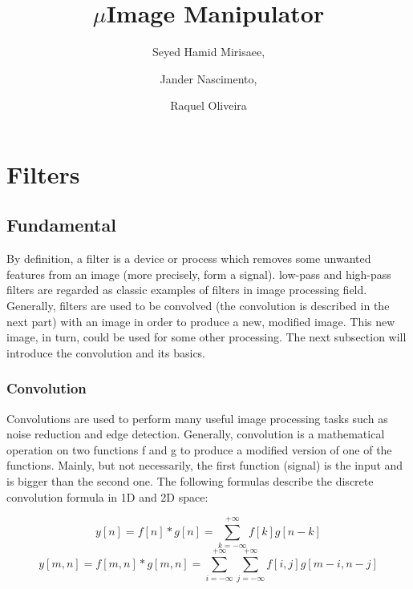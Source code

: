 \documentclass{article}
\begin{document}
\title{$\mu$Image Manipulator}

\author{Seyed Hamid Mirisaee,
\and Jander Nascimento, 
\and Raquel Oliveira}

\maketitle

\tableofcontents

\section{Filters}

	\subsection{Fundamental}

		By definition, a filter is a device or process which removes some unwanted features from an image (more precisely, form a signal).
		low-pass and high-pass filters are regarded as  classic examples of filters in image processing field. Generally, filters are used to be convolved 
		(the convolution is described in the next part) with an image in order to produce a new, modified image. This new image, in turn, could
		be used for some other processing. The next subsection will introduce the convolution and its basics.
		
		\subsubsection{Convolution}

			Convolutions are used to perform many useful image processing tasks such as noise reduction and edge detection. Generally,
			convolution is a mathematical operation on two functions f and g to produce a modified version of one of the functions.
			Mainly, but not necessarily, the first function (signal) is the input and is bigger than the second one.
			The following formulas describe the discrete convolution formula in 1D and 2D space:

			\begin{equation}
			y[n] = f[n]*g[n] = \sum_{k=-\infty}^{+\infty} f[k]g[n-k]
			\end{equation}
			\begin{equation}
			y[m,n] = f[m,n]*g[m,n] = \sum_{i=-\infty}^{+\infty}\sum_{j=-\infty}^{+\infty}f[i,j]g[m-i,n-j]
			\end{equation}
\end{document}
